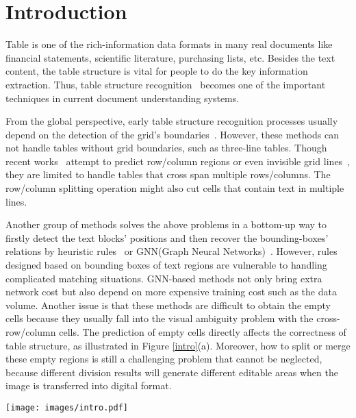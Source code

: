\documentclass[runningheads]{llncs}
\begin{document}
\section{Introduction}
Table is one of the rich-information data formats in many real documents like financial statements, scientific literature, purchasing lists, etc. Besides the text content, the table structure is vital for people to do the key information extraction. Thus, table structure recognition~\cite{kieninger1998table,nishida2017understanding,WangPH04,schreiber2017deepdesrt,gobel2013icdar,gao2019icdar,zhong2019image} becomes one of the important techniques in current document understanding systems.

From the global perspective, early table structure recognition processes usually depend on the detection of the grid's boundaries~\cite{liu2008identifying,liu2009improving}. However, these methods can not handle tables without grid boundaries, such as three-line tables.
Though recent works~\cite{schreiber2017deepdesrt,paliwal2019tablenet,siddiqui2019rethinking,siddiqui2019deeptabstr}  attempt to predict row/column regions or even invisible grid lines~\cite{tensmeyer2019deep}, they are limited to handle tables that cross span multiple rows/columns.
The row/column splitting operation might also cut cells that contain text in multiple lines.

Another group of methods solves the above problems in a bottom-up way to firstly detect the text blocks' positions and then recover the bounding-boxes' relations by heuristic rules~\cite{zheng2020global} or GNN(Graph Neural Networks)~\cite{ScarselliGTHM09,li2020gfte,chi2019complicated,qasim2019rethinking,raja2020table}.
However, rules designed based on bounding boxes of text regions are vulnerable to handling complicated matching situations. GNN-based methods not only bring extra network cost but also depend on more expensive training cost such as the data volume. Another issue is that these methods are difficult to obtain the empty cells because they usually fall into the visual ambiguity problem with the cross-row/column cells. The prediction of empty cells directly affects the correctness of table structure, as illustrated in Figure \ref{intro}(a).
Moreover, how to split or merge these empty regions is still a challenging problem that cannot be neglected, because different division results will generate different editable areas when the image is transferred into digital format.

\begin{figure*}[t]
\begin{center}
\texttt{[image: images/intro.pdf]}\\
\end{center}
\caption{ (a) The visualized results without considering empty cells. (b) The ground-truth of aligned bounding boxes and nodes relations. (c) A false example due to the ambiguity between the empty cell and cross-column cell.
The cells and their relations are represented as nodes and connected lines (red: vertical, green: horizontal). Empty cells are displayed in dashed circles.}
\label{intro}
\end{figure*}
\end{document}

